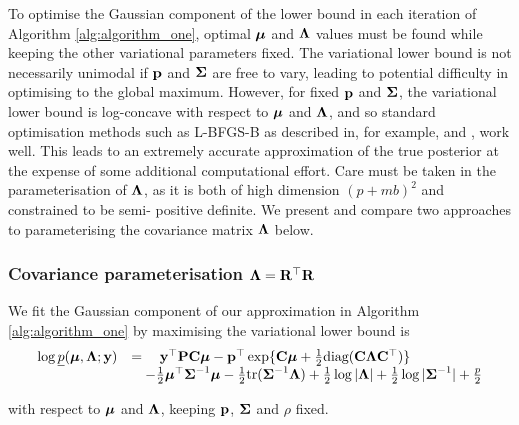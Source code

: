 To optimise the Gaussian component of the lower bound in each iteration of
Algorithm \ref{alg:algorithm_one}, optimal ${\boldsymbol \mu}$ and ${\boldsymbol \Lambda}$ values must be
found while keeping the other variational parameters fixed. The variational
lower bound is not necessarily unimodal if ${\bf p}$ and ${\boldsymbol \Sigma}$ are free to
vary, leading to potential difficulty in optimising to the global maximum.
However, for fixed ${\bf p}$ and ${\boldsymbol \Sigma}$, the variational lower bound is
log-concave with respect to ${\boldsymbol \mu}$ and ${\boldsymbol \Lambda}$, and so standard optimisation
methods such as L-BFGS-B as described in, for example, \cite{Liu1989} and
\cite{Nocedal2006}, work well. This leads to an extremely accurate
approximation of the true posterior at the expense of some additional
computational effort. Care must be taken in the parameterisation of ${\boldsymbol \Lambda}$,
as it is both of high dimension $(p + mb)^2$ and constrained to be semi-
positive definite. We present and compare two approaches to parameterising the
covariance matrix ${\boldsymbol \Lambda}$ below.
	
\subsubsection{Covariance parameterisation ${\boldsymbol \Lambda} = {\bf R}^\top {\bf R}$}
We fit the Gaussian component of our approximation in Algorithm
\ref{alg:algorithm_one} by maximising  the variational lower bound is
\begin{equation}
\label{eq:gva_lower_bound}
\begin{array}{ll}
	\log \underline{p}({\boldsymbol \mu}, {\boldsymbol \Lambda}; {\bf y}) & = \quad {\bf y}^\top{\bf P} {\bf C} {\boldsymbol\mu} - {\bf p}^\top \exp\{{\bf C} {\boldsymbol \mu} + \tfrac{1}{2} \text{diag}({\bf C} {\boldsymbol \Lambda} {\bf C}^\top)\} \\
    & \quad - \tfrac{1}{2} {\boldsymbol \mu}^\top {\boldsymbol\Sigma}^{-1} {\boldsymbol \mu} - \tfrac{1}{2} \text{tr}{({\boldsymbol\Sigma}^{-1} {\boldsymbol\Lambda})} + \tfrac{1}{2} \log{|{\boldsymbol\Lambda}|} + \tfrac{1}{2} \log{|{\boldsymbol\Sigma}^{-1}|}  + \tfrac{p}{2}
\end{array}
\end{equation}

\noindent with respect to ${\boldsymbol \mu}$ and ${\boldsymbol \Lambda}$, keeping ${\bf p}$, ${\boldsymbol \Sigma}$ and
$\rho$ fixed.
		
